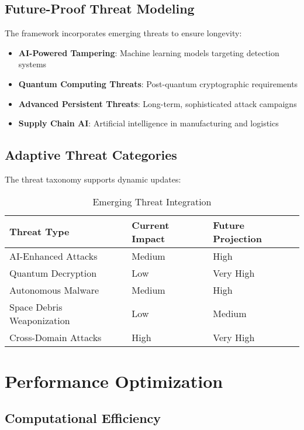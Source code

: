 \documentclass[binding=0.6cm]{sapthesis}
\begin{document}
\subsection{Future-Proof Threat Modeling}

The framework incorporates emerging threats to ensure longevity:

\begin{itemize}
    \item \textbf{AI-Powered Tampering}: Machine learning models targeting detection systems
    \item \textbf{Quantum Computing Threats}: Post-quantum cryptographic requirements
    \item \textbf{Advanced Persistent Threats}: Long-term, sophisticated attack campaigns
    \item \textbf{Supply Chain AI}: Artificial intelligence in manufacturing and logistics
\end{itemize}

\subsection{Adaptive Threat Categories}

The threat taxonomy supports dynamic updates:

\begin{table}[H]
\centering
\caption{Emerging Threat Integration}
\begin{tabular}{|l|l|l|}
\hline
\textbf{Threat Type} & \textbf{Current Impact} & \textbf{Future Projection} \\ \hline
AI-Enhanced Attacks & Medium & High \\ \hline
Quantum Decryption & Low & Very High \\ \hline
Autonomous Malware & Medium & High \\ \hline
Space Debris Weaponization & Low & Medium \\ \hline
Cross-Domain Attacks & High & Very High \\ \hline
\end{tabular}
\end{table}

\section{Performance Optimization}

\subsection{Computational Efficiency}
\end{document}
